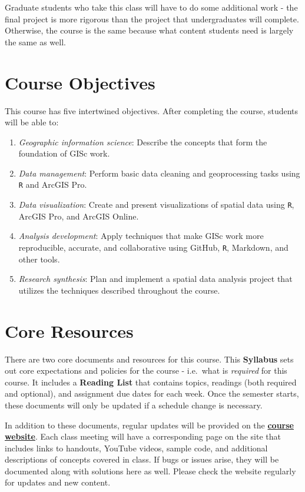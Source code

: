 \documentclass[
]{book}
\begin{document}
Graduate students who take this class will have to do some additional work - the final project is more rigorous than the project that undergraduates will complete. Otherwise, the course is the same because what content students need is largely the same as well.

\hypertarget{course-objectives}{%
\section{Course Objectives}\label{course-objectives}}

This course has five intertwined objectives. After completing the course, students will be able to:

\begin{enumerate}
\def\labelenumi{\arabic{enumi}.}
\item
  \emph{Geographic information science}: Describe the concepts that form the foundation of GISc work.
\item
  \emph{Data management}: Perform basic data cleaning and geoprocessing tasks using \texttt{R} and ArcGIS Pro.
\item
  \emph{Data visualization}: Create and present visualizations of spatial data using \texttt{R}, ArcGIS Pro, and ArcGIS Online.
\item
  \emph{Analysis development}: Apply techniques that make GISc work more reproducible, accurate, and collaborative using GitHub, \texttt{R}, Markdown, and other tools.
\item
  \emph{Research synthesis}: Plan and implement a spatial data analysis project that utilizes the techniques described throughout the course.
\end{enumerate}

\hypertarget{core-resources}{%
\section{Core Resources}\label{core-resources}}

There are two core documents and resources for this course. This \textbf{Syllabus} sets out core expectations and policies for the course - i.e.~what is \emph{required} for this course. It includes a \textbf{Reading List} that contains topics, readings (both required and optional), and assignment due dates for each week. Once the semester starts, these documents will only be updated if a schedule change is necessary.

In addition to these documents, regular updates will be provided on the \href{https://slu-soc5650.github.io}{\textbf{course website}}. Each class meeting will have a corresponding page on the site that includes links to handouts, YouTube videos, sample code, and additional descriptions of concepts covered in class. If bugs or issues arise, they will be documented along with solutions here as well. Please check the website regularly for updates and new content.
\end{document}
